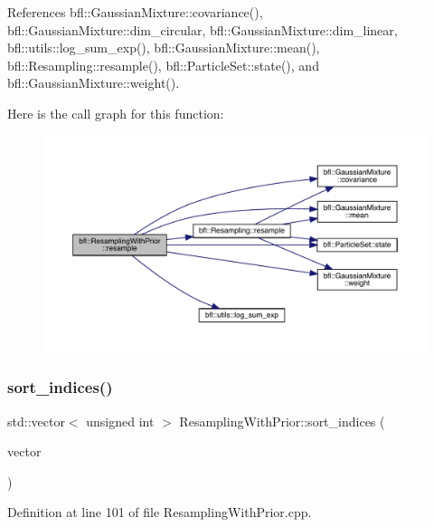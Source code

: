 References bfl\+::\+Gaussian\+Mixture\+::covariance(), bfl\+::\+Gaussian\+Mixture\+::dim\+\_\+circular, bfl\+::\+Gaussian\+Mixture\+::dim\+\_\+linear, bfl\+::utils\+::log\+\_\+sum\+\_\+exp(), bfl\+::\+Gaussian\+Mixture\+::mean(), bfl\+::\+Resampling\+::resample(), bfl\+::\+Particle\+Set\+::state(), and bfl\+::\+Gaussian\+Mixture\+::weight().

Here is the call graph for this function\+:
\nopagebreak
\begin{figure}[H]
\begin{center}
\leavevmode
\includegraphics[width=350pt]{classbfl_1_1ResamplingWithPrior_adc830de19fe1294ea404ced91f0b05d6_cgraph}
\end{center}
\end{figure}
\mbox{\label{classbfl_1_1ResamplingWithPrior_a0a0aa4d6c2f20b56edcb8d53f63afe09}} 
\subsubsection{\texorpdfstring{sort\+\_\+indices()}{sort\_indices()}}
{\footnotesize\ttfamily std\+::vector$<$ unsigned int $>$ Resampling\+With\+Prior\+::sort\+\_\+indices (\begin{DoxyParamCaption}\item[{const Eigen\+::\+Ref$<$ const Eigen\+::\+Vector\+Xd $>$ \&}]{vector }\end{DoxyParamCaption})\hspace{0.3cm}{\ttfamily [private]}}



Definition at line 101 of file Resampling\+With\+Prior.\+cpp.



